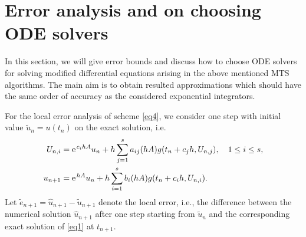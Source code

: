\section{Error analysis and on choosing ODE solvers}
\label{sec4}
In this section, we will give error bounds and discuss how to choose ODE
solvers for solving modified differential equations arising in the above mentioned
MTS algorithms.
The main aim is to obtain resulted approximations which should have the same order of accuracy as the considered
exponential integrators.

For the local error analysis of scheme \eqref{eq4}, we consider one step with initial value $\tilde{u}_n=u(t_n)$ on the exact solution, i.e.
\begin{subequations} \label{eq5.1}
\begin{align}
 U_{n,i}&= \ee^{c_i h A}u_n +h \sum_{j=1}^{s}a_{ij}(h A) g(t_n +c_j h, U_{n,j}), \q  1\leq i\leq s,  \label{eq5.1a} \\
u_{n+1} &= \ee^{h A}u_n +  h \sum_{i=1}^{s}b_{i}(h A)g(t_n +c_i h, U_{n,i}).  \label{eq5.1b} 
\end{align} 
\end{subequations}
Let $\tilde{e}_{n+1}=\hat{u}_{n+1}- \tilde{u}_{n+1}$
denote the local error, i.e., the difference between the numerical solution $\hat{u}_{n+1}$ after one step starting
from $\tilde{u}_{n}$ and the corresponding exact solution of \eqref{eq1} at $t_{n+1}$.
